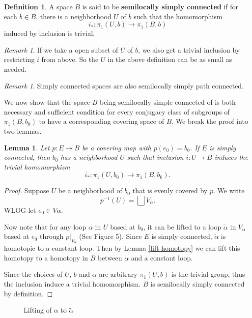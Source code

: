 \documentclass{amsart}
\newtheorem{lemma}[theorem]{Lemma}
\theoremstyle{definition}
\newtheorem{definition}[theorem]{Definition}
\theoremstyle{remark}
\newtheorem{remark}[theorem]{Remark}
\numberwithin{equation}{section}
\begin{document}
\begin{definition}
    A space $B$ is said to be \textbf{semilocally simply connected} if for each $b \in B$, there is a neighborhood $U$ of $b$ such that the homomorphism
    \[
    i_\ast : \pi_1(U, b) \to \pi_1(B, b)
    \]
induced by inclusion is trivial.
\end{definition}

\begin{remark}
    If we take a open subset of $U$ of $b$, we also get a trivial inclusion by restricting $i$ from above. So the $U$ in the above definition can be as small as needed.
\end{remark}

\begin{remark}
    Simply connected spaces are also semilocally simply path connected.
\end{remark}

We now show that the space $B$ being semilocally simple connected of is both necessary and sufficient condition for every conjugacy class of subgroups of $\pi_1(B, b_0)$ to have 
a corresponding covering space of $B$. We break the proof into two lemmas.

\begin{lemma} Let $p : E \to B$ be a covering map with $p(e_0) = b_0$. If $E$ is simply connected, then $b_0$ has a neighborhood $U$ such that inclusion $i : U \to B$ induces the trivial homomorphism
\[
i_\ast : \pi_1(U, b_0) \to \pi_1(B, b_0).
\]
\end{lemma}

\begin{proof} Suppose $U$ be a neighborhood of $b_0$ that is evenly covered by $p$. We write $$p^{-1}(U) = \bigsqcup V_\alpha.$$
WLOG let $e_0 \in V\alpha$.

Now note that for any loop $\alpha$ in $U$ based at $b_0$, it can be lifted to a loop $\tilde{\alpha}$ in $V_\alpha$ based at $e_0$ through $p|_{V_\alpha}$ (See Figure 5). Since $E$ is simply connected, $\tilde{\alpha}$ is homotopic to a constant loop. Then by Lemma \ref{lift homotopy} we can lift this homotopy to a homotopy in $B$ between $\alpha$ and a constant loop. 

Since the choices of $U$, $b$ and $\alpha$ are arbitrary $\pi_1(U, b)$ is the trivial group, thus the inclusion induce a trivial homomorphism. $B$ is semilocally simply connected by definition.
\end{proof}
\begin{figure}
    \centering
    \caption{Lifting of $\alpha$ to $\tilde{\alpha}$}
\end{figure}
\end{document}
